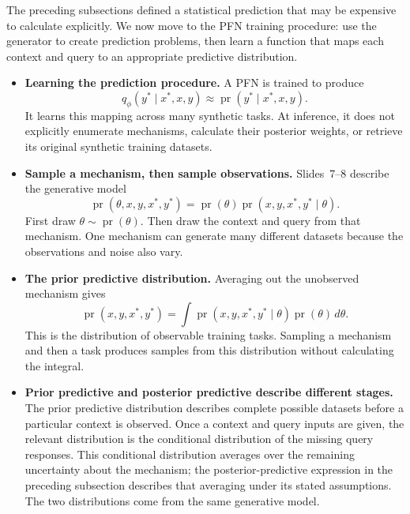 \documentclass[11pt]{article}
\newcommand{\pr}{\operatorname{pr}}
\newenvironment{notes}
  {\begin{itemize}\setlength{\itemsep}{0.45em}\setlength{\parsep}{0pt}}
  {\end{itemize}}
\begin{document}
The preceding subsections defined a statistical prediction that
may be expensive to calculate explicitly. We now move to the
PFN training procedure: use the generator to create prediction
problems, then learn a function that maps each context and query
to an appropriate predictive distribution.

\begin{notes}
    \item \textbf{Learning the prediction procedure.} A PFN is
    trained to produce
    \begin{equation}
        q_\phi(y^\ast\mid x^\ast,x,y)
        \approx
        \pr(y^\ast\mid x^\ast,x,y).
        \label{eq:pfn-predictive-approximation}
    \end{equation}
    It learns this mapping across many synthetic tasks.
    At inference, it does not explicitly enumerate mechanisms,
    calculate their posterior weights, or retrieve its original
    synthetic training datasets.

    \item \textbf{Sample a mechanism, then sample observations.}
    Slides~7--8 describe the generative model
    \[
        \pr(\theta,x,y,x^\ast,y^\ast)
        =
        \pr(\theta)\pr(x,y,x^\ast,y^\ast\mid\theta).
    \]
    First draw \(\theta\sim\pr(\theta)\). Then draw the context
    and query from that mechanism. One mechanism can generate many
    different datasets because the observations and noise also vary.

    \item \textbf{The prior predictive distribution.}
    Averaging out the unobserved mechanism gives
    \[
        \pr(x,y,x^\ast,y^\ast)
        =
        \int
        \pr(x,y,x^\ast,y^\ast\mid\theta)\pr(\theta)\,d\theta.
    \]
    This is the distribution of observable training tasks.
    Sampling a mechanism and then a task produces samples from
    this distribution without calculating the integral.

    \item \textbf{Prior predictive and posterior predictive describe
    different stages.} The prior predictive distribution describes
    complete possible datasets before a particular context is
    observed. Once a context and query inputs are given, the
    relevant distribution is the conditional distribution of the
    missing query responses. This conditional distribution
    averages over the remaining uncertainty about the mechanism;
    the posterior-predictive expression in the preceding subsection
    describes that averaging under its stated assumptions.
    The two distributions come from the same generative model.


\end{notes}
\end{document}
